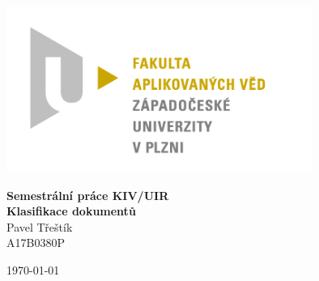 \documentclass[12pt]{article}
\begin{document}
\begin{titlepage}
\centerline{\includegraphics[width=10cm]{img/logo.jpg}}
\begin{center}
\vspace{30px}
{\Huge
\textbf{Semestrální práce KIV/UIR}\\
\vspace{1cm}
}
{\Large
\textbf{Klasifikace dokumentů}\\
}
\vspace{1cm}
{\large
Pavel Třeštík\\
}
{\normalsize
A17B0380P
}
\end{center}
\vspace{\fill}
\hfill
\begin{minipage}[t]{7cm}
\flushright
\today
\end{minipage}
\end{titlepage}

\tableofcontents
\newpage
{} %
%
%
\end{document}
